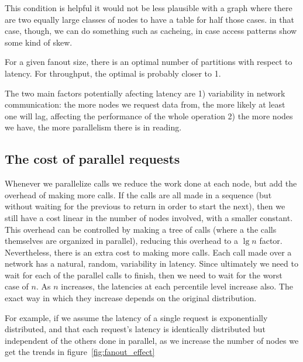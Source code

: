 This condition is helpful it would not be less plausible with a graph where there are two equally large classes of nodes to have a table for half those cases. in that case, though, we can do something such as cacheing, in case access patterns show some kind of skew. %


For a given fanout size, there is an optimal number of partitions with respect to latency. For throughput, the optimal is probably  closer to 1.


The two main factors potentially afecting latency are 1) variability in network communication: the more nodes we request data from, the more likely
at least one will lag, affecting the performance of the whole operation 2) the more nodes we have, the more parallelism there is in reading.

\subsection{The cost of parallel requests}
Whenever we parallelize calls we reduce the work done at each node, but add the overhead of making more calls. If the calls are all made in a sequence (but without waiting for the previous to return in order to start the next), then we still have a cost linear in the number of nodes involved, with a smaller constant.    This overhead can be controlled by making a tree of calls (where a the calls themselves are organized in parallel), reducing this overhead to a $\lg{n}$ factor.  Nevertheless, there is an extra cost to making more calls. Each call made over a network has a natural, random, variability in latency. Since ultimately we need to wait for each of the parallel calls to finish, then we need to wait for the worst case of $n$. As $n$ increases, the latencies at each percentile level increase also. The exact way in which they increase depends on the original distribution.

For example, if we assume the latency of a single request is exponentially distributed, and that each request's latency is identically distributed but independent of the others done in parallel, as we increase the number of nodes we get the trends in figure~\ref{fig:fanout_effect}


